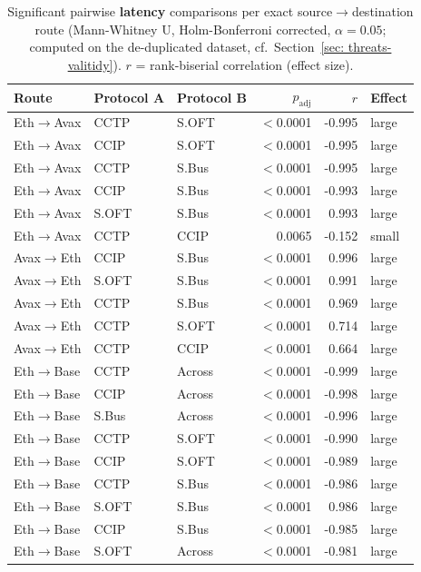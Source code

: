 \begin{table}[ht]
\caption{Significant pairwise \textbf{latency} comparisons per exact source$\to$destination route (Mann-Whitney U, Holm-Bonferroni corrected, $\alpha=0.05$; computed on the de-duplicated dataset, cf.\ Section~\ref{sec: threats-valitidy}). $r$ = rank-biserial correlation (effect size).}
\label{table:stats_pairwise_latency}
\begingroup
\tiny
\setlength{\tabcolsep}{3pt}
\begin{tabular}{lllrrl}
\toprule
\textbf{Route} & \textbf{Protocol A} & \textbf{Protocol B} & $p_{\text{adj}}$ & $r$ & \textbf{Effect} \\
\midrule
Eth$\to$Avax & CCTP & S.OFT & $<$0.0001 & -0.995 & large \\
Eth$\to$Avax & CCIP & S.OFT & $<$0.0001 & -0.995 & large \\
Eth$\to$Avax & CCTP & S.Bus & $<$0.0001 & -0.995 & large \\
Eth$\to$Avax & CCIP & S.Bus & $<$0.0001 & -0.993 & large \\
Eth$\to$Avax & S.OFT & S.Bus & $<$0.0001 & 0.993 & large \\
Eth$\to$Avax & CCTP & CCIP & 0.0065 & -0.152 & small \\
\midrule
Avax$\to$Eth & CCIP & S.Bus & $<$0.0001 & 0.996 & large \\
Avax$\to$Eth & S.OFT & S.Bus & $<$0.0001 & 0.991 & large \\
Avax$\to$Eth & CCTP & S.Bus & $<$0.0001 & 0.969 & large \\
Avax$\to$Eth & CCTP & S.OFT & $<$0.0001 & 0.714 & large \\
Avax$\to$Eth & CCTP & CCIP & $<$0.0001 & 0.664 & large \\
\midrule
Eth$\to$Base & CCTP & Across & $<$0.0001 & -0.999 & large \\
Eth$\to$Base & CCIP & Across & $<$0.0001 & -0.998 & large \\
Eth$\to$Base & S.Bus & Across & $<$0.0001 & -0.996 & large \\
Eth$\to$Base & CCTP & S.OFT & $<$0.0001 & -0.990 & large \\
Eth$\to$Base & CCIP & S.OFT & $<$0.0001 & -0.989 & large \\
Eth$\to$Base & CCTP & S.Bus & $<$0.0001 & -0.986 & large \\
Eth$\to$Base & S.OFT & S.Bus & $<$0.0001 & 0.986 & large \\
Eth$\to$Base & CCIP & S.Bus & $<$0.0001 & -0.985 & large \\
Eth$\to$Base & S.OFT & Across & $<$0.0001 & -0.981 & large \\

\end{tabular}
\end{table}
